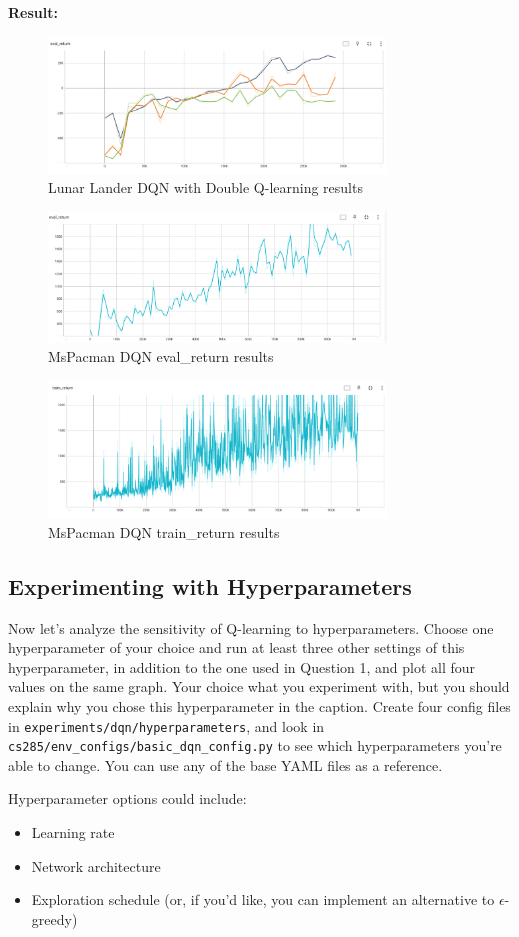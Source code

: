 \textbf{Result:}
\begin{figure}[H]
    \centering
    \includegraphics[width=0.8\textwidth]{imgs/dqn/lunarlander_doubleq.png}
    \caption{Lunar Lander DQN with Double Q-learning results}
    \label{fig:lunarlander_doubleq}
\end{figure}

\begin{figure}[H]
    \centering
    \includegraphics[width=0.8\textwidth]{imgs/dqn/mspacman.png}
    \caption{MsPacman DQN eval\_return results}
    \label{fig:mspacman}
\end{figure}

\begin{figure}[H]
    \centering
    \includegraphics[width=0.8\textwidth]{imgs/dqn/mspacman_train_return.png}
    \caption{MsPacman DQN train\_return results}
    \label{fig:mspacman_train_return}
\end{figure}

\subsection{Experimenting with Hyperparameters} Now let's analyze the sensitivity of Q-learning to hyperparameters. Choose one hyperparameter of your choice and run at least three other settings of this hyperparameter, in addition to the one used in Question 1, and plot all four values on the same graph. Your choice what you experiment with, but you should explain why you chose this hyperparameter in the caption. Create four config files in \verb|experiments/dqn/hyperparameters|, and look in \verb|cs285/env_configs/basic_dqn_config.py| to see which hyperparameters you're able to change. You can use any of the base YAML files as a reference.

Hyperparameter options could include:
\begin{itemize}
    \item Learning rate
    \item Network architecture
    \item Exploration schedule (or, if you'd like, you can implement an alternative to $\epsilon$-greedy)
\end{itemize}